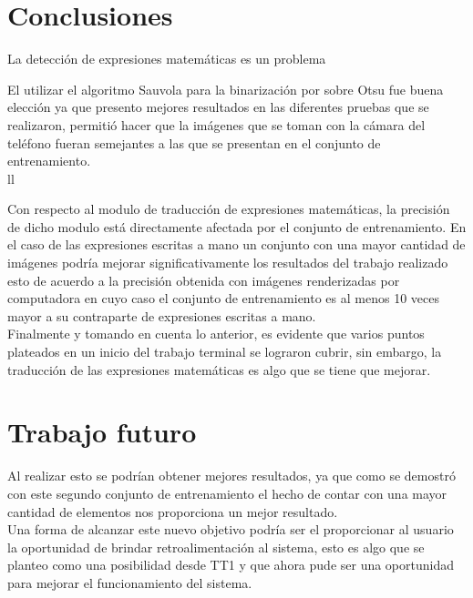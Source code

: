 \chapter{Conclusiones}
La detección de expresiones matemáticas es un problema

El utilizar el algoritmo Sauvola para la binarización por sobre Otsu fue buena elección ya que presento mejores resultados en las diferentes pruebas que se realizaron, permitió hacer que la imágenes que se toman con la cámara del teléfono fueran semejantes a las que se presentan en el conjunto de entrenamiento.\\ll

Con respecto al modulo de traducción de expresiones matemáticas, la precisión de dicho modulo está directamente afectada por el conjunto de entrenamiento. En el caso de las expresiones escritas a mano un conjunto con una mayor cantidad de imágenes podría mejorar significativamente los resultados del trabajo realizado esto de acuerdo a la precisión obtenida con imágenes renderizadas por computadora en cuyo caso el conjunto de entrenamiento es al menos 10 veces mayor a su contraparte de expresiones escritas a mano.\\

Finalmente y tomando en cuenta lo anterior, es evidente que varios puntos plateados en un inicio del trabajo terminal se lograron cubrir, sin embargo, la traducción de las expresiones matemáticas es algo que se tiene que mejorar.

\chapter{Trabajo futuro}


Al realizar esto se podrían obtener mejores resultados, ya que como se demostró con este segundo conjunto de entrenamiento el hecho de contar con una mayor cantidad de elementos nos proporciona un mejor resultado.\\

Una forma de alcanzar este nuevo objetivo podría ser el proporcionar al usuario la oportunidad de brindar retroalimentación al sistema, esto es algo que se planteo como una posibilidad desde TT1 y que ahora pude ser una oportunidad para mejorar el funcionamiento del sistema.